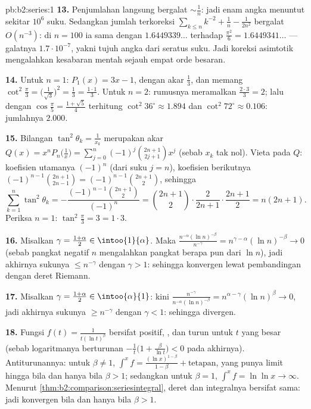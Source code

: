 \begin{solution}{pb:b2:series:1}
\textbf{13.} Penjumlahan langsung bergalat $\sim \frac1n$: jadi enam
angka menuntut sekitar $10^6$ suku. Sedangkan jumlah terkoreksi
$\sum_{k\leq n}k^{-2} + \frac1n - \frac1{2n^2}$ bergalat
$O(n^{-3})$: di $n = 100$ ia sama dengan $1.6449339\dots$ terhadap
$\frac{\pi^2}6 = 1.6449341\dots$ --- galatnya $1.7\cdot10^{-7}$,
yakni tujuh angka dari seratus suku. Jadi koreksi asimtotik mengalahkan
kesabaran mentah sejauh empat orde besaran.

\textbf{14.} Untuk $n = 1$: $P_1(x) = 3x - 1$, dengan akar $\frac13$, dan
memang $\cot^2\frac\pi3 = \bigl(\frac1{\sqrt3}\bigr)^2 =
\frac13 = \frac{1\cdot1}3$. Untuk $n = 2$: rumusnya meramalkan
$\frac{2\cdot3}3 = 2$; lalu dengan $\cos\frac\pi5 = \frac{1 +
\sqrt5}{4}$ terhitung $\cot^2 36^\circ \approx 1.894$ dan
$\cot^2 72^\circ \approx 0.106$: jumlahnya $2.000$.

\textbf{15.} Bilangan $\tan^2\theta_k = \frac1{x_k}$ merupakan
akar $Q(x) = x^nP_n\bigl(\frac1x\bigr) =
\sum_{j=0}^n(-1)^j\binom{2n+1}{2j+1}x^j$ (sebab $x_k$ tak nol).
Vieta pada $Q$: koefisien utamanya $(-1)^n$
(dari suku $j = n$), koefisien berikutnya $(-1)^{n-1}\binom{2n+1}{2n-1} =
(-1)^{n-1}\binom{2n+1}{2}$, sehingga
\[
\sum_{k=1}^n\tan^2\theta_k =
-\frac{(-1)^{n-1}\binom{2n+1}2}{(-1)^n} = \binom{2n+1}2\cdot
\frac{2}{2n+1}\cdot\frac{2n+1}{2}
= n(2n+1).
\]
Periksa $n = 1$: $\tan^2\frac\pi3 = 3 = 1\cdot3$.

\textbf{16.} Misalkan $\gamma = \frac{1+\alpha}2 \in
\intoo{1}{\alpha}$. Maka $\frac{n^{-\alpha}(\ln
n)^{-\beta}}{n^{-\gamma}} = n^{\gamma - \alpha}(\ln n)^{-\beta}
\to 0$ (sebab pangkat negatif $n$ mengalahkan pangkat berapa pun dari
$\ln n$), jadi akhirnya sukunya $\leq n^{-\gamma}$ dengan $\gamma > 1$:
sehingga konvergen lewat pembandingan dengan deret Riemann.

\textbf{17.} Misalkan $\gamma = \frac{1+\alpha}2 \in
\intoo{\alpha}{1}$: kini $\frac{n^{-\gamma}}{n^{-\alpha}(\ln
n)^{-\beta}} = n^{\alpha-\gamma}(\ln n)^{\beta} \to 0$, jadi
akhirnya sukunya $\geq n^{-\gamma}$ dengan $\gamma < 1$:
sehingga divergen.

\textbf{18.} Fungsi $f(t) = \frac1{t(\ln t)^\beta}$ bersifat positif,
, dan turun untuk $t$ yang besar (sebab logaritmanya
berturunan $-\frac1t\bigl(1 + \frac{\beta}{\ln t}\bigr) < 0$
pada akhirnya). Antiturunannya: untuk $\beta \neq 1$,
$\int^x f = \frac{(\ln x)^{1-\beta}}{1-\beta} + \text{tetapan}$,
yang punya limit hingga bila dan hanya bila $\beta > 1$; sedangkan untuk
$\beta = 1$, $\int^x f = \ln\ln x \to \infty$. Menurut
\cref{thm:b2:comparison:seriesintegral}, deret dan
integralnya bersifat sama: jadi konvergen bila dan hanya bila $\beta > 1$.


\end{solution}
